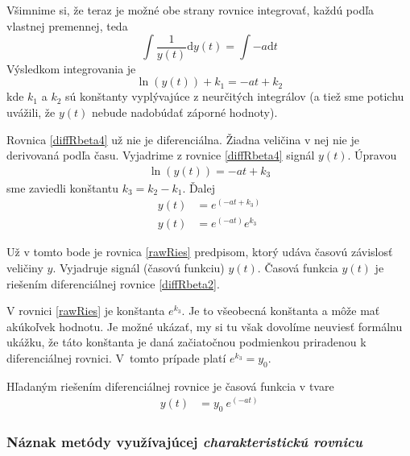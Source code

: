 \documentclass[a4paper, 10pt, ]{article}
\begin{document}
Všimnime si, že teraz je možné obe strany rovnice integrovať, každú podľa vlastnej premennej, teda
\begin{equation} \label{diffRbeta3}
    \int \frac{1}{y(t)}\text{d}y(t) =  \int - a \text{d}t
\end{equation}
Výsledkom integrovania je
\begin{equation} \label{diffRbeta4}
     \ln \left(  y(t)  \right) + k_1 =   - a t + k_2
\end{equation}
kde $k_1$ a $k_2$ sú konštanty vyplývajúce z neurčitých integrálov (a tiež sme potichu uvážili, že $y(t)$ nebude nadobúdať záporné hodnoty).

Rovnica \eqref{diffRbeta4} už nie je diferenciálna. Žiadna veličina v nej nie je derivovaná podľa času. Vyjadrime z rovnice \eqref{diffRbeta4} signál $y(t)$. Úpravou 
\begin{align}
    \ln \left(  y(t)  \right)  =   - a t + k_3
\end{align}
sme zaviedli konštantu $k_3 = k_2 - k_1$. Ďalej
\begin{subequations}
    \begin{align}
        y(t)   &=  e^{\left( - a t + k_3 \right)} \\
        y(t)   &=  e^{\left( - a t \right)}  e^{k_3} \label{rawRies}
    \end{align}
\end{subequations}

Už v tomto bode je rovnica \eqref{rawRies} predpisom, ktorý udáva časovú závislosť veličiny $y$. Vyjadruje signál (časovú funkciu) $y(t)$. Časová funkcia $y(t)$ je riešením diferenciálnej rovnice \eqref{diffRbeta2}.

V rovnici \eqref{rawRies} je konštanta $e^{k_3}$. Je to všeobecná konštanta a môže mať akúkoľvek hodnotu. Je možné ukázať, my si tu však dovolíme neuviesť formálnu ukážku, že táto konštanta je daná začiatočnou podmienkou priradenou k diferenciálnej rovnici. V~tomto prípade platí $e^{k_3} = y_0$.

Hľadaným riešením diferenciálnej rovnice je časová funkcia v tvare
\begin{align}
    y(t)   &=  y_0 \ e^{\left( - a t \right)}   \label{rawRies2}
\end{align}





\subsubsection{Náznak metódy využívajúcej \emph{charakteristickú rovnicu}}
\end{document}
